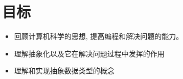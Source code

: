 \section{目标}
\begin{frame}\ft{\secname}
\begin{itemize}
\item 回顾计算机科学的思想, 提高编程和解决问题的能力。
\item 理解抽象化以及它在解决问题过程中发挥的作用
\item 理解和实现抽象数据类型的概念
\end{itemize}
\end{frame}
